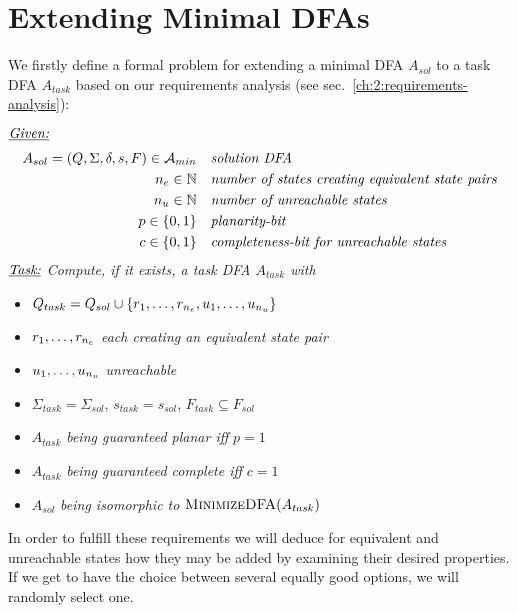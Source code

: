 
\chapter{Extending Minimal DFAs} \label{ch:4}

We firstly define a formal problem for extending a minimal DFA $A_{sol}$ to a task DFA $A_{task}$ based on our requirements analysis (see sec.~\ref{ch:2:requirements-analysis}):
\begin{definition}[ExtendMinDFA] $ $ \\
	$ $ \vspace{-0.cm} \\
	\noindent $\underline{\emph{Given:}}$
	\vspace{-0.2cm}
	\begin{align*}
	A_{sol} = (Q, \Sigma, \delta, s, F) \in {\mathcal{A}_{min}}\ \ \ & \emph{solution DFA} \\
	{n_e} \in \mathbb{N}\ \ \ & \emph{number of states creating equivalent state pairs} \\
	{n_u} \in \mathbb{N}\ \ \ & \emph{number of unreachable states} \\
	p \in \{0,1\}\ \ \ & \emph{planarity-bit} \\
	c \in \{0,1\}\ \ \ & \emph{completeness-bit for unreachable states}
	\end{align*}
	\noindent $\underline{\emph{Task:}}$ \emph{Compute, if it exists, a task DFA $A_{task}$ with}
	\begin{itemize}
		\item $Q_{task} = Q_{sol} \cup \{ r_1, \ldots, r_{n_e}, u_1, \ldots, u_{n_u} \}$
		\item $r_1, \ldots, r_{n_e}$ \emph{each creating an equivalent state pair\footnotemark}
		\item $u_1, \ldots, u_{n_u}$ \emph{unreachable}
		\item $\Sigma_{task} = \Sigma_{sol}$, $s_{task} = s_{sol}$, $F_{task} \subseteq F_{sol}$
		\item $A_{task}$ \emph{being guaranteed planar iff} $p = 1$
		\item $A_{task}$ \emph{being guaranteed complete iff} $c = 1$
		\item $A_{sol}$ \emph{being isomorphic to} $\textsc{MinimizeDFA}(A_{task})$
	\end{itemize}
\end{definition}
\noindent In order to fulfill these requirements we will deduce for equivalent and unreachable states how they may be added by examining their desired properties. If we get to have the choice between several equally good options, we will randomly select one.


